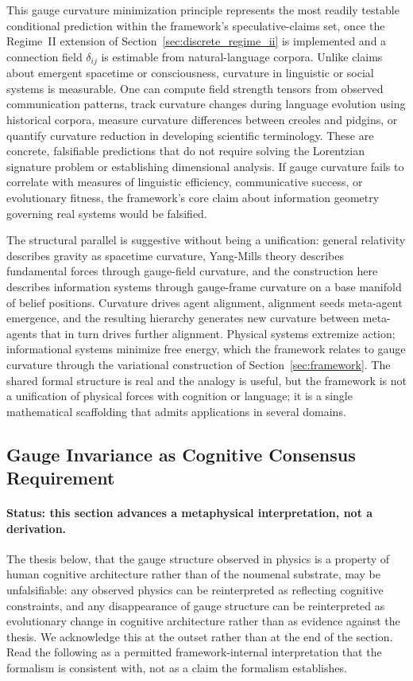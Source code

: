 \documentclass[11pt]{article}
\begin{document}
This gauge curvature minimization principle represents the most readily testable conditional prediction within the framework's speculative-claims set, once the Regime~II extension of Section~\ref{sec:discrete_regime_ii} is implemented and a connection field $\delta_{ij}$ is estimable from natural-language corpora. Unlike claims about emergent spacetime or consciousness, curvature in linguistic or social systems is measurable. One can compute field strength tensors from observed communication patterns, track curvature changes during language evolution using historical corpora, measure curvature differences between creoles and pidgins, or quantify curvature reduction in developing scientific terminology. These are concrete, falsifiable predictions that do not require solving the Lorentzian signature problem or establishing dimensional analysis. If gauge curvature fails to correlate with measures of linguistic efficiency, communicative success, or evolutionary fitness, the framework's core claim about information geometry governing real systems would be falsified.

The structural parallel is suggestive without being a unification: general relativity describes gravity as spacetime curvature, Yang-Mills theory describes fundamental forces through gauge-field curvature, and the construction here describes information systems through gauge-frame curvature on a base manifold of belief positions. Curvature drives agent alignment, alignment seeds meta-agent emergence, and the resulting hierarchy generates new curvature between meta-agents that in turn drives further alignment. Physical systems extremize action; informational systems minimize free energy, which the framework relates to gauge curvature through the variational construction of Section~\ref{sec:framework}. The shared formal structure is real and the analogy is useful, but the framework is not a unification of physical forces with cognition or language; it is a single mathematical scaffolding that admits applications in several domains.

\subsection{Gauge Invariance as Cognitive Consensus Requirement}
\label{sec:gauge_invariance_consensus}

\paragraph{Status: this section advances a metaphysical interpretation, not a derivation.} The thesis below, that the gauge structure observed in physics is a property of human cognitive architecture rather than of the noumenal substrate, may be unfalsifiable: any observed physics can be reinterpreted as reflecting cognitive constraints, and any disappearance of gauge structure can be reinterpreted as evolutionary change in cognitive architecture rather than as evidence against the thesis. We acknowledge this at the outset rather than at the end of the section. Read the following as a permitted framework-internal interpretation that the formalism is consistent with, not as a claim the formalism establishes.
\end{document}
